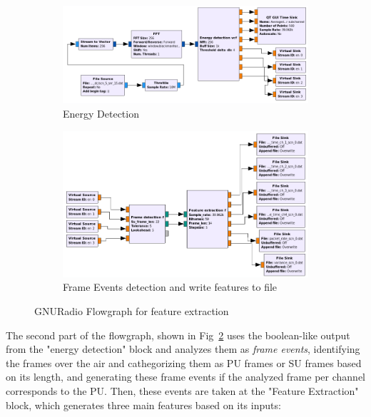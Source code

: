 \begin{figure}[!htb]
    \centering
    \begin{subfigure}[htb]{\textwidth}
        \centering
        \includegraphics[width=\linewidth]{figures/feature_extraction_1}
        \caption{Energy Detection}
        \label{fig:ed}
    \end{subfigure}
    \begin{subfigure}[htb]{\textwidth}
        \centering
        \includegraphics[width=\linewidth]{figures/feature_extraction_2}
        \caption{Frame Events detection and write features to file}
        \label{fig:frame_events}
    \end{subfigure}
    \caption{GNURadio Flowgraph for feature extraction}
    \label{fig:feature_extraction}
\end{figure}

The second part of the flowgraph, shown in Fig~\ref{fig:frame_events} uses the boolean-like output from the "energy detection" block and analyzes them as \emph{frame events}, identifying the frames over the air and cathegorizing them as \ac{PU} frames or \ac{SU} frames based on its length, and generating these frame events if the analyzed frame per channel corresponds to the \ac{PU}.  Then, these events are taken at the "Feature Extraction" block, which generates three main features based on its inputs:

